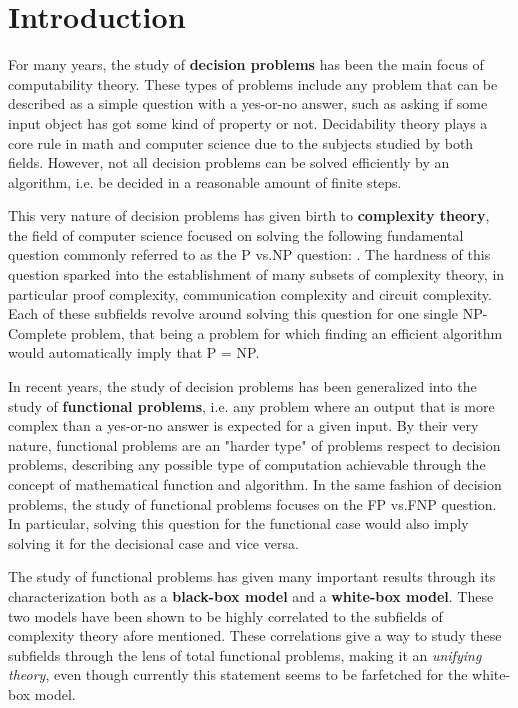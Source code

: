 
\chapter{Introduction} \label{chap:introduction}

For many years, the study of \textbf{decision problems} has been the main focus of computability theory. These types of problems include any problem that can be described as a simple question with a yes-or-no answer, such as asking if some input object has got some kind of property or not. Decidability theory plays a core rule in math and computer science due to the subjects studied by both fields. However, not all decision problems can be solved efficiently by an algorithm, i.e. be decided in a reasonable amount of finite steps.

This very nature of decision problems has given birth to \textbf{complexity theory}, the field of computer science focused on solving the following fundamental question commonly referred to as the \textsf{P} vs.\@ \textsf{NP} question: . The hardness of this question sparked into the establishment of many subsets of complexity theory, in particular proof complexity, communication complexity and circuit complexity. Each of these subfields revolve around solving this question for one single \textsf{NP}-Complete problem, that being a problem for which finding an efficient algorithm would automatically imply that \textsf{P} = \textsf{NP}.

In recent years, the study of decision problems has been generalized into the study of \textbf{functional problems}, i.e. any problem where an output that is more complex than a yes-or-no answer is expected for a given input. By their very nature, functional problems are an "harder type" of problems respect to decision problems, describing any possible type of computation achievable through the concept of mathematical function and algorithm. In the same fashion of decision problems, the study of functional problems focuses on the \textsf{FP} vs.\@ \textsf{FNP} question. In particular, solving this question for the functional case would also imply solving it for the decisional case and vice versa.

The study of functional problems has given many important results through its characterization both as a \textbf{black-box model} and a \textbf{white-box model}. These two models have been shown to be highly correlated to the subfields of complexity theory afore mentioned. These correlations give a way to study these subfields through the lens of total functional problems, making it an \textit{unifying theory}, even though currently this statement seems to be farfetched for the white-box model.


\cleardoublepage